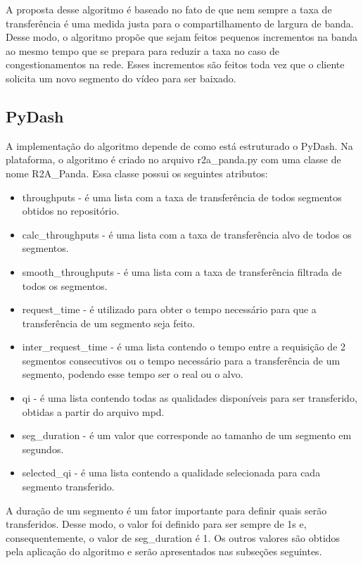 \documentclass[10pt,twocolumn,letterpaper]{article}
\begin{document}
A proposta desse algoritmo é baseado no fato de que nem sempre a taxa de transferência é uma medida justa para o compartilhamento de largura de banda. Desse modo, o algoritmo propõe que sejam feitos pequenos incrementos na banda ao mesmo tempo que se prepara para reduzir a taxa no caso de congestionamentos na rede. Esses incrementos são feitos toda vez que o cliente solicita um novo segmento do vídeo para ser baixado.

\subsection{PyDash}
A implementação do algoritmo depende de como está estruturado o PyDash. Na plataforma, o algoritmo é criado no arquivo r2a\_panda.py com uma classe de nome R2A\_Panda. Essa classe possui os seguintes atributos:

\begin{itemize}
  \item throughputs - é uma lista com a taxa de transferência de todos segmentos obtidos no repositório.
  \item calc\_throughputs - é uma lista com a taxa de transferência alvo de todos os segmentos.
  \item smooth\_throughputs - é uma lista com a taxa de transferência filtrada de todos os segmentos.
  \item request\_time - é utilizado para obter o tempo necessário para que a transferência de um segmento seja feito.
  \item inter\_request\_time - é uma lista contendo o tempo entre a requisição de 2 segmentos consecutivos ou o tempo necessário para a transferência de um segmento, podendo esse tempo ser o real ou o alvo.
  \item qi - é uma lista contendo todas as qualidades disponíveis para ser transferido, obtidas a partir do arquivo mpd.
  \item seg\_duration - é um valor que corresponde ao tamanho de um segmento em segundos.
  \item selected\_qi - é uma lista contendo a qualidade selecionada para cada segmento transferido.
\end{itemize}

A duração de um segmento é um fator importante para definir quais serão transferidos. Desse modo, o valor foi definido para ser sempre de 1s e, consequentemente, o valor de seg\_duration é 1. Os outros valores são obtidos pela aplicação do algoritmo e serão apresentados nas subseções seguintes.
\end{document}
